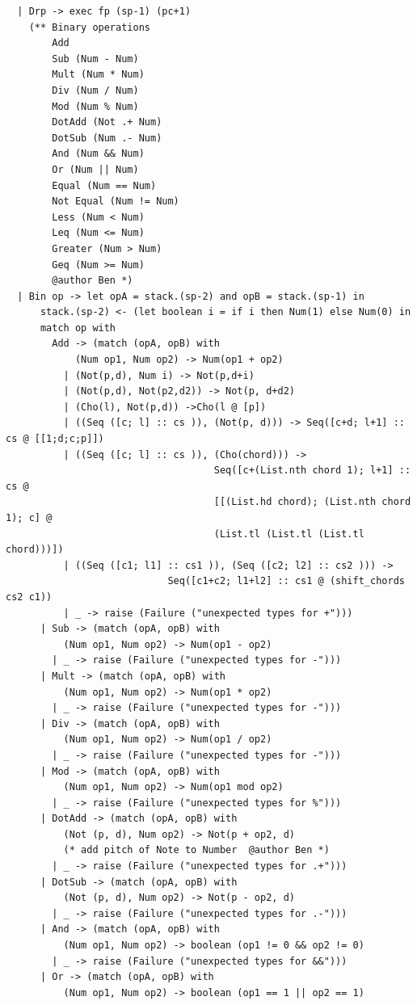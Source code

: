 \documentclass[12pt,A4]{book}
\begin{document}
\begin{verbatim}
  | Drp -> exec fp (sp-1) (pc+1)
    (** Binary operations
        Add
        Sub (Num - Num)
        Mult (Num * Num)
        Div (Num / Num)
        Mod (Num % Num)
        DotAdd (Not .+ Num)
        DotSub (Num .- Num)
        And (Num && Num)
        Or (Num || Num)
        Equal (Num == Num)
        Not Equal (Num != Num)
        Less (Num < Num)
        Leq (Num <= Num)
        Greater (Num > Num)
        Geq (Num >= Num) 
        @author Ben *)
  | Bin op -> let opA = stack.(sp-2) and opB = stack.(sp-1) in     
      stack.(sp-2) <- (let boolean i = if i then Num(1) else Num(0) in
      match op with
        Add -> (match (opA, opB) with 
            (Num op1, Num op2) -> Num(op1 + op2)
          | (Not(p,d), Num i) -> Not(p,d+i)
          | (Not(p,d), Not(p2,d2)) -> Not(p, d+d2)
          | (Cho(l), Not(p,d)) ->Cho(l @ [p])
          | ((Seq ([c; l] :: cs )), (Not(p, d))) -> Seq([c+d; l+1] :: cs @ [[1;d;c;p]])
          | ((Seq ([c; l] :: cs )), (Cho(chord))) -> 
                                    Seq([c+(List.nth chord 1); l+1] :: cs @  
                                    [[(List.hd chord); (List.nth chord 1); c] @ 
                                    (List.tl (List.tl (List.tl chord)))])
          | ((Seq ([c1; l1] :: cs1 )), (Seq ([c2; l2] :: cs2 ))) -> 
                            Seq([c1+c2; l1+l2] :: cs1 @ (shift_chords cs2 c1))
          | _ -> raise (Failure ("unexpected types for +")))
      | Sub -> (match (opA, opB) with 
          (Num op1, Num op2) -> Num(op1 - op2)
        | _ -> raise (Failure ("unexpected types for -")))
      | Mult -> (match (opA, opB) with 
          (Num op1, Num op2) -> Num(op1 * op2)
        | _ -> raise (Failure ("unexpected types for -")))
      | Div -> (match (opA, opB) with 
          (Num op1, Num op2) -> Num(op1 / op2)
        | _ -> raise (Failure ("unexpected types for -")))
      | Mod -> (match (opA, opB) with 
          (Num op1, Num op2) -> Num(op1 mod op2)
        | _ -> raise (Failure ("unexpected types for %")))
      | DotAdd -> (match (opA, opB) with 
          (Not (p, d), Num op2) -> Not(p + op2, d) 
          (* add pitch of Note to Number  @author Ben *)
        | _ -> raise (Failure ("unexpected types for .+")))
      | DotSub -> (match (opA, opB) with 
          (Not (p, d), Num op2) -> Not(p - op2, d) 
        | _ -> raise (Failure ("unexpected types for .-")))
      | And -> (match (opA, opB) with 
          (Num op1, Num op2) -> boolean (op1 != 0 && op2 != 0)
        | _ -> raise (Failure ("unexpected types for &&")))
      | Or -> (match (opA, opB) with 
          (Num op1, Num op2) -> boolean (op1 == 1 || op2 == 1)

\end{verbatim}
\end{document}
